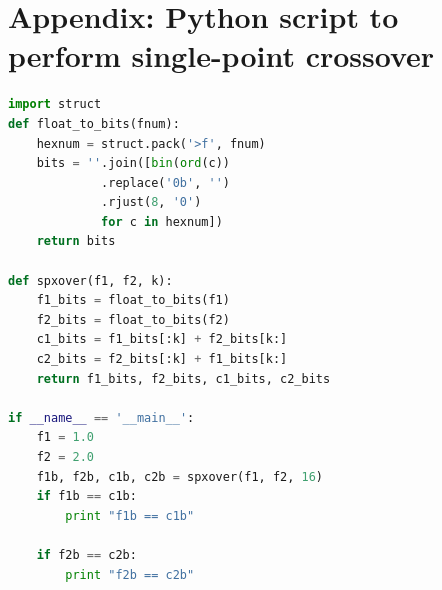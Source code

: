 \documentclass[10pt,letterpaper]{article}
\begin{document}
\section*{Appendix: Python script to perform single-point crossover}
\begin{scriptsize}
\begin{lstlisting}[language=python]
import struct
def float_to_bits(fnum):
    hexnum = struct.pack('>f', fnum)
    bits = ''.join([bin(ord(c))
    	     .replace('0b', '')
    	     .rjust(8, '0') 
    	     for c in hexnum])
    return bits

def spxover(f1, f2, k):
    f1_bits = float_to_bits(f1)
    f2_bits = float_to_bits(f2)
    c1_bits = f1_bits[:k] + f2_bits[k:]
    c2_bits = f2_bits[:k] + f1_bits[k:]
    return f1_bits, f2_bits, c1_bits, c2_bits

if __name__ == '__main__':
	f1 = 1.0
	f2 = 2.0
	f1b, f2b, c1b, c2b = spxover(f1, f2, 16)
	if f1b == c1b:
		print "f1b == c1b"

	if f2b == c2b:
		print "f2b == c2b"
\end{lstlisting}
\end{scriptsize}
\end{document}
